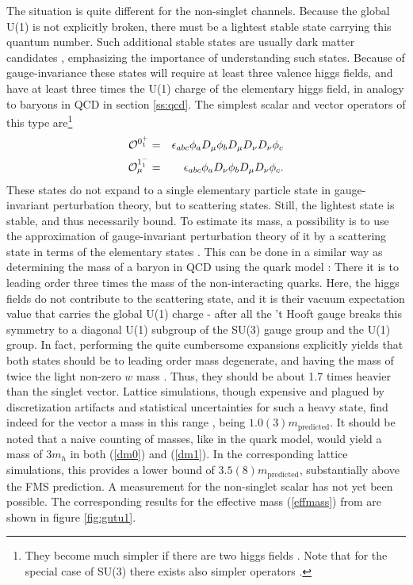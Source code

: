 \documentclass[final,12pt,3p,longtitle]{elsarticle}
\newcommand*{\no}{\noindent}
\newcommand*{\bea}{\begin{eqnarray}}
\newcommand*{\eea}{\end{eqnarray}}
\newcommand*{\pref}[1]{(\ref{#1})}
\newcommand*{\1}{1\!\!\!\bot}
\newcommand*{\op}{{\cal O}}
\begin{document}
The situation is quite different for the non-singlet channels. Because the global U(1) is not explicitly broken, there must be a lightest stable state carrying this quantum number. Such additional stable states are usually dark matter candidates \cite{Morrissey:2009tf}, emphasizing the importance of understanding such states. Because of gauge-invariance these states will require at least three valence higgs fields, and have at least three times the U(1) charge of the elementary higgs field, in analogy to baryons in QCD in section \ref{ss:qcd}. The simplest scalar and vector operators of this type are\footnote{They become much simpler if there are two higgs fields \cite{Iida:2007qp}. Note that for the special case of SU(3) there exists also simpler operators \cite{Maas:2017xzh}.} \cite{Maas:2017xzh}
\bea
\op^{0^+_1}&=&\epsilon_{abc}\phi_a D_\mu\phi_b D_\mu D_\nu D_\nu\phi_c\label{dm0}\\
\op^{1^-_1}_\mu&=&\epsilon_{abc}\phi_a D_\nu\phi_b D_\mu D_\nu\phi_c\label{dm1}.
\eea
\no These states do not expand to a single elementary particle state in gauge-invariant perturbation theory, but to scattering states. Still, the lightest state is stable, and thus necessarily bound. To estimate its mass, a possibility is to use the approximation of gauge-invariant perturbation theory of it by a scattering state in terms of the elementary states \cite{Maas:2017xzh}. This can be done in a similar way as determining the mass of a baryon in QCD using the quark model \cite{BeiglboCk:2006lfa}: There it is to leading order three times the mass of the non-interacting quarks. Here, the higgs fields do not contribute to the scattering state, and it is their vacuum expectation value that carries the global U(1) charge - after all the 't Hooft gauge breaks this symmetry to a diagonal U(1) subgroup of the SU(3) gauge group and the U(1) group. In fact, performing the quite cumbersome expansions explicitly yields that both states should be to leading order mass degenerate, and having the mass of twice the light non-zero $w$ mass \cite{Maas:2017xzh}. Thus, they should be about 1.7 times heavier than the singlet vector. Lattice simulations, though expensive and plagued by discretization artifacts and statistical uncertainties for such a heavy state, find indeed for the vector a mass in this range \cite{Maas:unpublishedtoerek}, being $1.0(3)m_\text{predicted}$. It should be noted that a naive counting of masses, like in the quark model, would yield a mass of $3m_h$ in both \pref{dm0} and \pref{dm1}. In the corresponding lattice simulations, this provides a lower bound of $3.5(8)m_\text{predicted}$, substantially above the FMS prediction. A measurement for the non-singlet scalar has not yet been possible. The corresponding results for the effective mass \pref{effmass} from \cite{Maas:2017pcw,Maas:unpublishedtoerek} are shown in figure \ref{fig:gutu1}.
\end{document}
